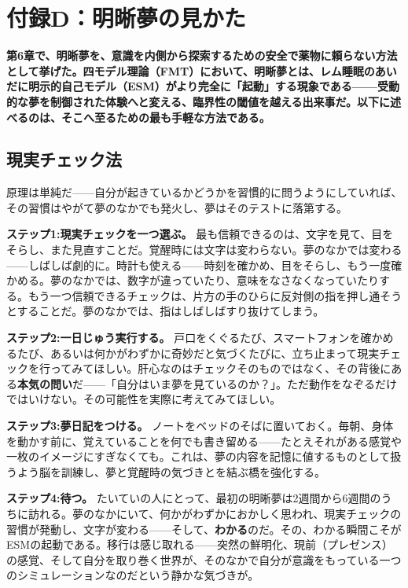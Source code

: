 \documentclass[11pt, twoside, openright]{book}
\begin{document}
\chapter*{付録D：明晰夢の見かた}

\textbf{第6章で、明晰夢を、意識を内側から探索するための安全で薬物に頼らない方法として挙げた。四モデル理論（FMT）において、明晰夢とは、レム睡眠のあいだに明示的自己モデル（ESM）がより完全に「起動」する現象である------受動的な夢を制御された体験へと変える、臨界性の閾値を越える出来事だ。以下に述べるのは、そこへ至るための最も手軽な方法である。}

\section*{現実チェック法}

原理は単純だ------自分が起きているかどうかを習慣的に問うようにしていれば、その習慣はやがて夢のなかでも発火し、夢はそのテストに落第する。

\textbf{ステップ1:現実チェックを一つ選ぶ。} 最も信頼できるのは、文字を見て、目をそらし、また見直すことだ。覚醒時には文字は変わらない。夢のなかでは変わる------しばしば劇的に。時計も使える------時刻を確かめ、目をそらし、もう一度確かめる。夢のなかでは、数字が違っていたり、意味をなさなくなっていたりする。もう一つ信頼できるチェックは、片方の手のひらに反対側の指を押し通そうとすることだ。夢のなかでは、指はしばしばすり抜けてしまう。

\textbf{ステップ2:一日じゅう実行する。} 戸口をくぐるたび、スマートフォンを確かめるたび、あるいは何かがわずかに奇妙だと気づくたびに、立ち止まって現実チェックを行ってみてほしい。肝心なのはチェックそのものではなく、その背後にある\textbf{本気の問い}だ------「自分はいま夢を見ているのか？」。ただ動作をなぞるだけではいけない。その可能性を実際に考えてみてほしい。

\textbf{ステップ3:夢日記をつける。} ノートをベッドのそばに置いておく。毎朝、身体を動かす前に、覚えていることを何でも書き留める------たとえそれがある感覚や一枚のイメージにすぎなくても。これは、夢の内容を記憶に値するものとして扱うよう脳を訓練し、夢と覚醒時の気づきとを結ぶ橋を強化する。

\textbf{ステップ4:待つ。} たいていの人にとって、最初の明晰夢は2週間から6週間のうちに訪れる。夢のなかにいて、何かがわずかにおかしく思われ、現実チェックの習慣が発動し、文字が変わる------そして、\textbf{わかる}のだ。その、わかる瞬間こそがESMの起動である。移行は感じ取れる------突然の鮮明化、現前（プレゼンス）の感覚、そして自分を取り巻く世界が、そのなかで自分が意識をもっている一つのシミュレーションなのだという静かな気づきが。
\end{document}
